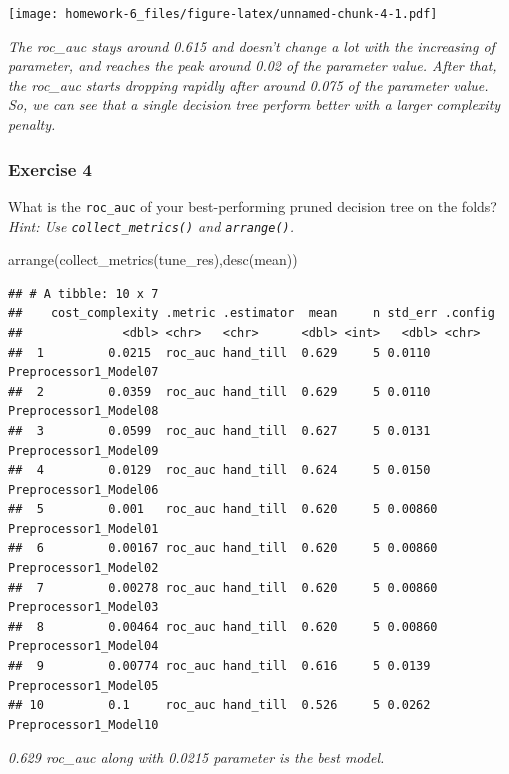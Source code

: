 \documentclass[
]{article}
\newenvironment{Shaded}{\begin{snugshade}}{\end{snugshade}}
\newcommand{\FunctionTok}[1]{\textcolor[rgb]{0.00,0.00,0.00}{#1}}
\newcommand{\NormalTok}[1]{#1}
\begin{document}
\texttt{[image: homework-6\_files/figure-latex/unnamed-chunk-4-1.pdf]}

\hfill\break
\emph{The roc\_auc stays around 0.615 and doesn't change a lot with the
increasing of parameter, and reaches the peak around 0.02 of the
parameter value. After that, the roc\_auc starts dropping rapidly after
around 0.075 of the parameter value.}\\
\emph{So, we can see that a single decision tree perform better with a
larger complexity penalty.}

\hypertarget{exercise-4}{%
\subsubsection{Exercise 4}\label{exercise-4}}

What is the \texttt{roc\_auc} of your best-performing pruned decision
tree on the folds? \emph{Hint: Use \texttt{collect\_metrics()} and
\texttt{arrange()}.}

\begin{Shaded}
\begin{Highlighting}[]
\FunctionTok{arrange}\NormalTok{(}\FunctionTok{collect\_metrics}\NormalTok{(tune\_res),}\FunctionTok{desc}\NormalTok{(mean))}
\end{Highlighting}
\end{Shaded}

\begin{verbatim}
## # A tibble: 10 x 7
##    cost_complexity .metric .estimator  mean     n std_err .config              
##              <dbl> <chr>   <chr>      <dbl> <int>   <dbl> <chr>                
##  1         0.0215  roc_auc hand_till  0.629     5 0.0110  Preprocessor1_Model07
##  2         0.0359  roc_auc hand_till  0.629     5 0.0110  Preprocessor1_Model08
##  3         0.0599  roc_auc hand_till  0.627     5 0.0131  Preprocessor1_Model09
##  4         0.0129  roc_auc hand_till  0.624     5 0.0150  Preprocessor1_Model06
##  5         0.001   roc_auc hand_till  0.620     5 0.00860 Preprocessor1_Model01
##  6         0.00167 roc_auc hand_till  0.620     5 0.00860 Preprocessor1_Model02
##  7         0.00278 roc_auc hand_till  0.620     5 0.00860 Preprocessor1_Model03
##  8         0.00464 roc_auc hand_till  0.620     5 0.00860 Preprocessor1_Model04
##  9         0.00774 roc_auc hand_till  0.616     5 0.0139  Preprocessor1_Model05
## 10         0.1     roc_auc hand_till  0.526     5 0.0262  Preprocessor1_Model10
\end{verbatim}

\hfill\break
\emph{0.629 roc\_auc along with 0.0215 parameter is the best model.}
\end{document}
